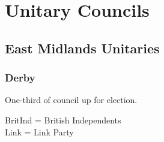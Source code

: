 \documentclass[a4paper,openany]{book}
\begin{document}
\part{Unitary Councils}

\chapter{East Midlands Unitaries}

\section{Derby}

One-third of council up for election.

BritInd = British Independents\\Link = Link Party
\end{document}
